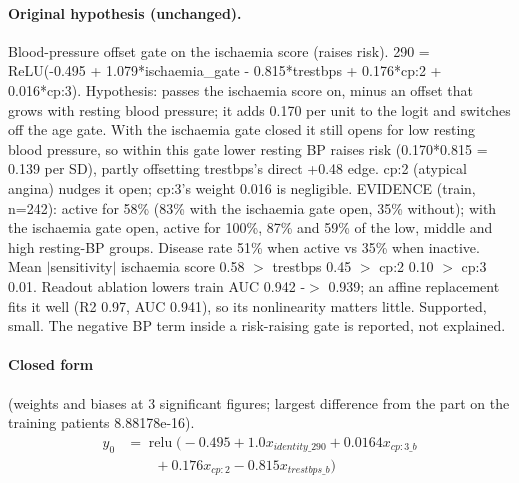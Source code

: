 \documentclass[a4paper,10pt]{article}
\newif\ifreviewmarks
\newcommand{\reviewrule}{\noindent{\color{BrickRed}\rule{\linewidth}{0.8pt}}}
\newenvironment{drafted}[1][]{%
  \ifreviewmarks\par\addvspace{\medskipamount}\reviewrule\par\nopagebreak
  \noindent{\color{BrickRed}\sffamily\footnotesize\textbf{Thesis Draft}\quad #1\hfill review}\par\nopagebreak\smallskip\fi}{%
  \ifreviewmarks\par\smallskip\noindent{\color{BrickRed}\sffamily\footnotesize end of thesis draft}\par\nopagebreak\reviewrule\par\medskip\fi}
\begin{document}
\begin{drafted}[plain-language layer: heart-s5-c1]
\paragraph{Original hypothesis (unchanged).} Blood-pressure offset gate on the ischaemia score (raises risk). 290 = ReLU(-0.495 + 1.079*ischaemia\_\allowbreak{}gate - 0.815*trestbps + 0.176*cp:2 + 0.016*cp:3). Hypothesis: passes the ischaemia score on, minus an offset that grows with resting blood pressure; it adds 0.170 per unit to the logit and switches off the age gate. With the ischaemia gate closed it still opens for low resting blood pressure, so within this gate lower resting BP raises risk (0.170*0.815 = 0.139 per SD), partly offsetting trestbps's direct +0.48 edge. cp:2 (atypical angina) nudges it open; cp:3's weight 0.016 is negligible. EVIDENCE (train, n=242): active for 58\% (83\% with the ischaemia gate open, 35\% without); with the ischaemia gate open, active for 100\%, 87\% and 59\% of the low, middle and high resting-BP groups. Disease rate 51\% when active vs 35\% when inactive. Mean $|$sensitivity$|$ ischaemia score 0.58 $>$ trestbps 0.45 $>$ cp:2 0.10 $>$ cp:3 0.01. Readout ablation lowers train AUC 0.942 -$>$ 0.939; an affine replacement fits it well (R2 0.97, AUC 0.941), so its nonlinearity matters little. Supported, small. The negative BP term inside a risk-raising gate is reported, not explained.
\paragraph{Closed form} {\footnotesize(weights and biases at 3 significant figures; largest difference from the part on the training patients 8.88178e-16).}
{\small\begingroup\allowdisplaybreaks
\begin{align*}
y_{0} &= \operatorname{relu}\bigl(-0.495 + 1.0 x_{identity\_290} + 0.0164 x_{cp:3\_b} \\
&\qquad + 0.176 x_{cp:2} - 0.815 x_{trestbps\_b}\bigr)
\end{align*}\endgroup}


\end{drafted}
\end{document}
